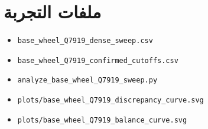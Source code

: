 \documentclass[12pt]{article}
\begin{document}
\section{ملفات التجربة}

\begin{itemize}
\item \texttt{base\_wheel\_Q7919\_dense\_sweep.csv}
\item \texttt{base\_wheel\_Q7919\_confirmed\_cutoffs.csv}
\item \texttt{analyze\_base\_wheel\_Q7919\_sweep.py}
\item \texttt{plots/base\_wheel\_Q7919\_discrepancy\_curve.svg}
\item \texttt{plots/base\_wheel\_Q7919\_balance\_curve.svg}
\end{itemize}
\end{document}

